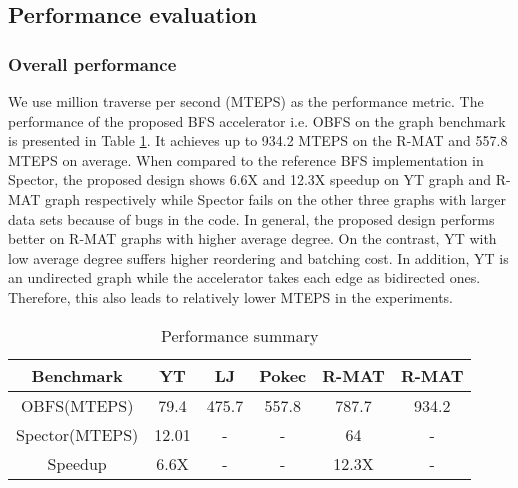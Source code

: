 \subsection{Performance evaluation}
\subsubsection{Overall performance}
We use million traverse per second (MTEPS) as 
the performance metric. The performance of the proposed BFS 
accelerator i.e. OBFS on the graph benchmark is 
presented in Table \ref{tab:performance-summary}. 
It achieves up to 934.2 MTEPS on the R-MAT\uppercase\expandafter{}
and 557.8 MTEPS on average. When compared to the reference BFS 
implementation in Spector, the proposed design shows 6.6X and 12.3X 
speedup on YT graph and R-MAT\uppercase\expandafter{} 
graph respectively while Spector fails on the other three graphs with larger data sets 
because of bugs in the code. In general, the proposed design performs better on 
R-MAT graphs with higher average degree. On the contrast, YT with 
low average degree suffers higher reordering and batching cost. In addition, 
YT is an undirected graph while the accelerator takes each edge as bidirected ones. 
Therefore, this also leads to relatively lower MTEPS in the experiments. 
\begin{table}
    \centering
  \caption{Performance summary}
  \label{tab:performance-summary}
  \begin{tabular}{cccccc}
    \toprule
      Benchmark & YT & LJ & Pokec & R-MAT\uppercase\expandafter{\romannumeral1} & R-MAT\uppercase\expandafter{\romannumeral2} \\
    \midrule
	OBFS(MTEPS) & 79.4 & 475.7 & 557.8 & 787.7 & 934.2 \\
	Spector(MTEPS) & 12.01 & - & - & 64 & -\\
      Speedup & 6.6X & - & - & 12.3X & - \\
  \bottomrule
\end{tabular}
\vspace{-1em}
\end{table}


